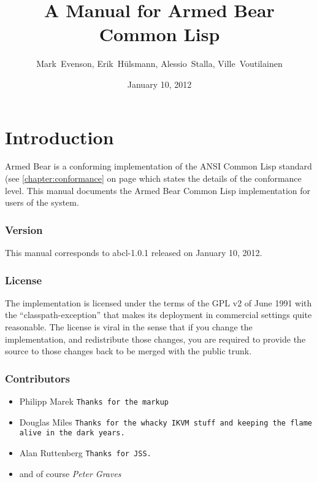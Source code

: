 \documentclass[10pt]{book}
\begin{document}
\title{A Manual for Armed Bear Common Lisp}
\date{January 10, 2012}
\author{Mark~Evenson, Erik~H\"{u}lsmann, Alessio~Stalla, Ville~Voutilainen}

\maketitle

\tableofcontents

\chapter{Introduction}

Armed Bear is a conforming implementation of the ANSI Common Lisp
standard (see \ref{chapter:conformance} on page
\pageref{chapter:conformance} which states the details of the
conformance level.  This manual documents the Armed Bear Common Lisp
implementation for users of the system.

\subsection{Version}
This manual corresponds to abcl-1.0.1 released on January 10, 2012.

\subsection{License}

The implementation is licensed under the terms of the GPL v2 of June
1991 with the ``classpath-exception'' that makes its deployment in
commercial settings quite reasonable.  The license is viral in the
sense that if you change the implementation, and redistribute those
changes, you are required to provide the source to those changes back
to be merged with the public trunk.

\subsection{Contributors}


\begin{itemize}
\item Philipp Marek
\texttt{Thanks for the markup}
\item Douglas Miles
\texttt{Thanks for the whacky IKVM stuff and keeping the flame alive
  in the dark years.}


\item Alan Ruttenberg
\texttt{Thanks for JSS.}


\item and of course
\emph{Peter Graves}
\end{itemize}
\end{document}
